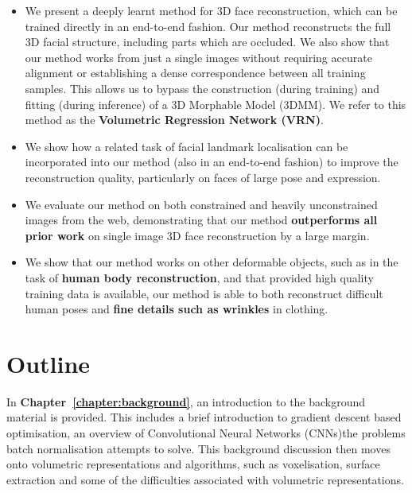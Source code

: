 \begin{itemize}
\item %
  We present a deeply learnt method for 3D face reconstruction, which
  can be trained directly in an end-to-end fashion. Our method
  reconstructs the full 3D facial structure, including parts which are
  occluded. We also show that our method works from just a single
  images without requiring accurate alignment or establishing a dense
  correspondence between all training samples.  This allows us to
  bypass the construction (during training) and fitting (during
  inference) of a 3D Morphable Model (3DMM).  We refer to this method
  as the \textbf{Volumetric Regression Network (VRN)}.

\item %
  We show how a related task of facial landmark localisation can be
  incorporated into our method (also in an end-to-end fashion) to
  improve the reconstruction quality, particularly on faces of large
  pose and expression.

\item We evaluate our method on both constrained and heavily
  unconstrained images from the web, demonstrating that our method
  \textbf{outperforms all prior work} on single image 3D face
  reconstruction by a large margin.

\item We show that our method works on other deformable objects, such
  as in the task of \textbf{human body reconstruction}, and that
  provided high quality training data is available, our method is able
  to both reconstruct difficult human poses and \textbf{fine details
    such as wrinkles} in clothing.

\end{itemize}

\section{Outline}

In \textbf{Chapter~\ref{chapter:background}}, an introduction to the
background material is provided. This includes a brief introduction to
gradient descent based optimisation, an overview of Convolutional
Neural Networks (CNNs)the problems batch normalisation attempts to
solve. This background discussion then moves onto volumetric
representations and algorithms, such as voxelisation, surface
extraction and some of the difficulties associated with volumetric
representations.


